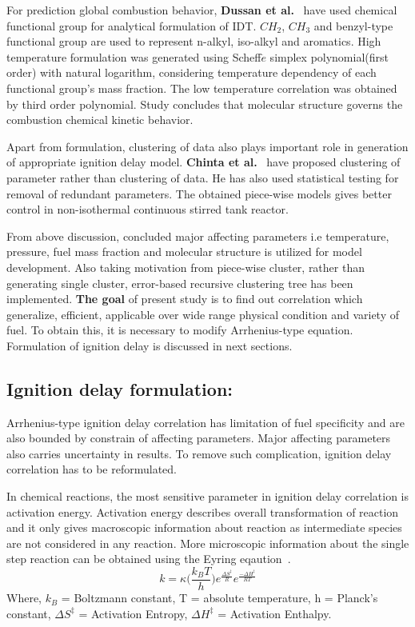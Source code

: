\documentclass[preprint,12pt]{elsarticle}
\begin{document}
		For prediction global combustion behavior, \textbf{Dussan et al.}~\cite{dussan2019chemical} have used chemical functional group for analytical formulation of IDT. $CH_2$, $CH_3$ and benzyl-type functional group are used to represent n-alkyl, iso-alkyl and aromatics. High temperature formulation was generated using Scheff$\ddot e$ simplex polynomial(first order) with natural logarithm, considering temperature dependency of each functional group's mass fraction. The low temperature correlation was obtained by third order polynomial. Study concludes that molecular structure governs the combustion chemical kinetic behavior.
		
		Apart from formulation, clustering of data also plays important role in generation of appropriate ignition delay model. \textbf{Chinta et al.}~\cite{chinta2019prediction} have proposed clustering of parameter rather than clustering of data. He has also used statistical testing for removal of redundant parameters. The obtained piece-wise models gives better control in non-isothermal continuous stirred tank reactor. 
		
		From above discussion, concluded major affecting parameters i.e temperature, pressure, fuel mass fraction and molecular structure is utilized for model development. Also taking motivation from piece-wise cluster, rather than generating single cluster, error-based recursive clustering tree has been implemented.\textbf{ The goal} of present study is to find out correlation which generalize, efficient, applicable over wide range physical condition and variety of fuel. To obtain this, it is necessary to modify Arrhenius-type equation. Formulation of ignition delay is discussed in next sections. 
		
		\subsection{Ignition delay formulation:}
		
		Arrhenius-type ignition delay correlation has limitation of fuel specificity and are also bounded by constrain of affecting parameters. Major affecting parameters also carries uncertainty in results. To remove such complication, ignition delay correlation has to be reformulated. 
		
		In chemical reactions, the most sensitive parameter in ignition delay correlation is activation energy. Activation energy describes overall transformation of reaction and it only gives macroscopic information about reaction as intermediate species are not considered in any reaction. More microscopic information about the single step reaction can be obtained using the Eyring eqaution~\cite{modernbook}.
		\begin{equation}\label{eyring}
		k = \kappa\bigg( \frac{k_BT}{h} \bigg) e^{\frac{\Delta S^{\ddagger}}{R}} e^{\frac{-\Delta H^{\ddagger}}{RT}}
		\end{equation} 
		Where, $k_B$ = Boltzmann constant, T = absolute temperature, h = Planck's constant, $\Delta S^{\ddagger}$ = Activation Entropy, $\Delta H^{\ddagger}$ = Activation Enthalpy. 
		
\end{document}
